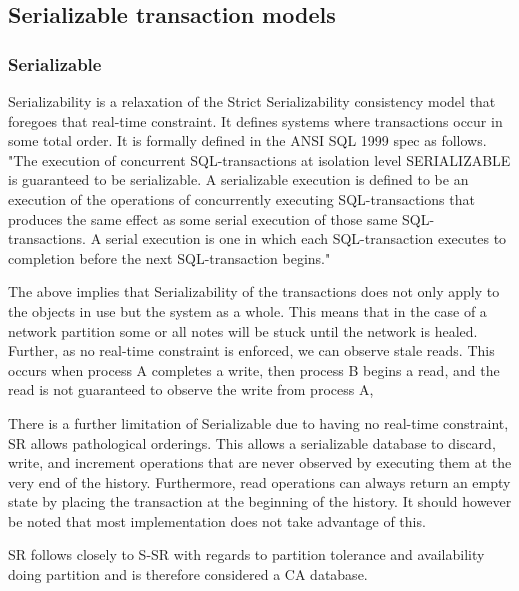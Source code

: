 \documentclass[a4paper,10pt,titlepage]{report}
\begin{document}
    \subsection{Serializable transaction models}

    \subsubsection{Serializable}

    Serializability is a relaxation of the Strict Serializability consistency model that foregoes that real-time constraint. It defines systems where transactions occur in some total order. It is formally defined in the ANSI SQL 1999 spec as follows. "The execution of concurrent SQL-transactions at isolation level SERIALIZABLE is guaranteed to be serializable. A serializable execution is defined to be an execution of the operations of concurrently executing SQL-transactions that produces the same effect as some serial execution of those same SQL-transactions. A serial execution is one in which each SQL-transaction executes to completion before the next SQL-transaction begins." \cite{ansisql1999}\\
    \vspace{5mm}

    The above implies that Serializability of the transactions does not only apply to the objects in use but the system as a whole. This means that in the case of a network partition some or all notes will be stuck until the network is healed. Further, as no real-time constraint is enforced,  we can observe stale reads. This occurs when process A completes a write, then process B begins a read, and the read is not guaranteed to observe the write from process A,

    There is a further limitation of Serializable due to having no real-time constraint, SR allows pathological orderings. This allows a serializable database to discard, write, and increment operations that are never observed by executing them at the very end of the history. Furthermore, read operations can always return an empty state by placing the transaction at the beginning of the history. It should however be noted that most implementation does not take advantage of this.

    SR follows closely to S-SR with regards to partition tolerance and availability doing partition and is therefore considered a CA database.
\end{document}
